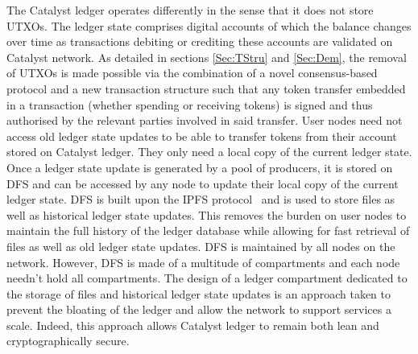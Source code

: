 The Catalyst ledger operates differently in the sense that it does not store UTXOs. The ledger state comprises digital accounts of which the balance changes over time as transactions debiting or crediting these accounts are validated on Catalyst network. As detailed in sections \ref{Sec:TStru} and \ref{Sec:Dem}, the removal of UTXOs is made possible via the combination of a novel consensus-based protocol and a new transaction structure such that any token transfer embedded in a transaction (whether spending or receiving tokens) is signed and thus authorised by the relevant parties involved in said transfer. User nodes need not access old ledger state updates to be able to transfer tokens from their account stored on Catalyst ledger. They only need a local copy of the current ledger state.\\

Once a ledger state update is generated by a pool of producers, it is stored on DFS and can be accessed by any node to update their local copy of the current ledger state. DFS is built upon the IPFS protocol~\cite{ipfs} and is used to store files as well as historical ledger state updates. This removes the burden on user nodes to maintain the full history of the ledger database while allowing for fast retrieval of files as well as old ledger state updates. DFS is maintained by all nodes on the network. However, DFS is made of a multitude of compartments and each node needn’t hold all compartments. The design of a ledger compartment dedicated to the storage of files and historical ledger state updates is an approach taken to prevent the bloating of the ledger and allow the network to support services a scale. Indeed, this approach allows Catalyst ledger to remain both lean and cryptographically secure.
